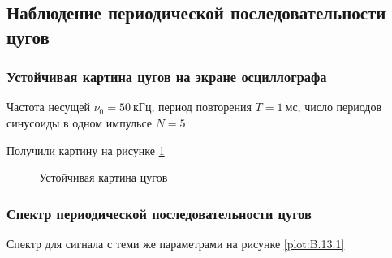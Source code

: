 \documentclass[a4paper, 12pt]{article}
\begin{document}
        \subsection{Наблюдение периодической последовательности цугов}
            \setcounter{subsubsection}{10}
            \subsubsection{Устойчивая картина цугов на экране осциллографа}

                Частота несущей $\nu_0 = 50~кГц$, период повторения $T = 1~мс$, число периодов синусоиды в одном импульсе $N = 5$

                Получили картину на рисунке \ref{plot:B.11}

                \begin{figure}[ht]
                    \centering
                    \begin{minipage}[ht]{0.49\linewidth}
                        \caption{Устойчивая картина цугов}
                        \label{plot:B.11}
                    \end{minipage}
                \end{figure}

            \subsubsection{Спектр периодической последовательности цугов}

                Спектр для сигнала с теми же параметрами на рисунке \ref{plot:B.13.1}
\end{document}
